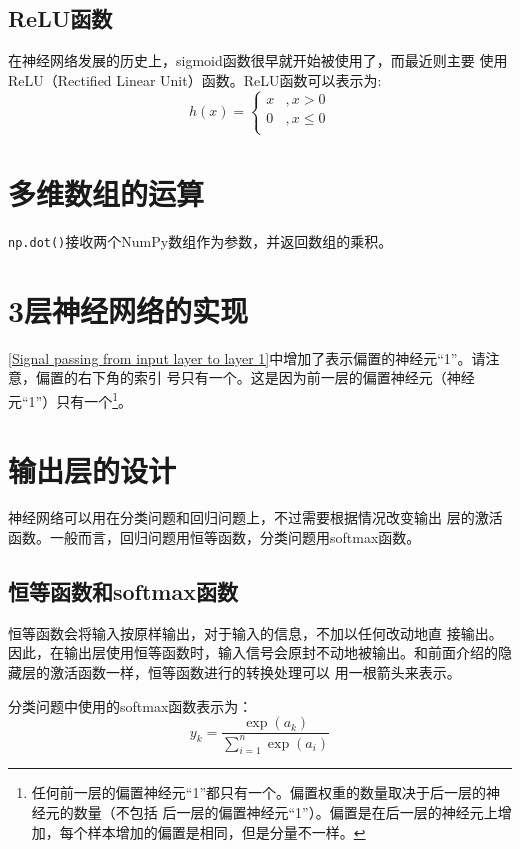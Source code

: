 \subsection{ReLU函数}
在神经网络发展的历史上，sigmoid函数很早就开始被使用了，而最近则主要
使用ReLU（Rectified Linear Unit）函数。ReLU函数可以表示为:
\begin{equation}
    h(x)=\left\{
    \begin{array}{ll}
        x & , x>0     \\
        0 & , x\leq 0 \\
    \end{array}
    \right.
\end{equation}
\section{多维数组的运算}
\verb|np.dot()|接收两个NumPy数组作为参数，并返回数组的乘积。

\section{3层神经网络的实现}
\autoref{Signal passing from input layer to layer 1}中增加了表示偏置的神经元“1”。请注意，偏置的右下角的索引
号只有一个。这是因为前一层的偏置神经元（神经元“1”）只有一个\footnote{任何前一层的偏置神经元“1”都只有一个。偏置权重的数量取决于后一层的神经元的数量（不包括
    后一层的偏置神经元“1”）。偏置是在后一层的神经元上增加，每个样本增加的偏置是相同，但是分量不一样。}。

\section{输出层的设计}
神经网络可以用在分类问题和回归问题上，不过需要根据情况改变输出
层的激活函数。一般而言，回归问题用恒等函数，分类问题用softmax函数。
\subsection{恒等函数和softmax函数}
恒等函数会将输入按原样输出，对于输入的信息，不加以任何改动地直
接输出。因此，在输出层使用恒等函数时，输入信号会原封不动地被输出。和前面介绍的隐藏层的激活函数一样，恒等函数进行的转换处理可以
用一根箭头来表示。

分类问题中使用的softmax函数表示为：
\begin{equation}
    \label{eq3-10}
    y_k=\frac{\exp(a_k)}{\sum\limits_{i=1}^n{\exp(a_i)}}
\end{equation}

